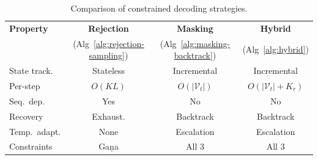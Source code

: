
\begin{table}[H]
\centering
\scriptsize
\caption{Comparison of constrained decoding strategies.}
\label{tab:strategy-comparison}
\begin{tabular}{lccc}
\toprule
\textbf{Property}
    & \textbf{Rejection}
    & \textbf{Masking}
    & \textbf{Hybrid} \\
    & (Alg~\ref{alg:rejection-sampling})
    & (Alg~\ref{alg:masking-backtrack})
    & (Alg~\ref{alg:hybrid}) \\
\midrule
State track.
    & Stateless
    & Incremental
    & Incremental \\
Per-step
    & $O(KL)$
    & $O(|\mathcal{V}_t|)$
    & $O(|\mathcal{V}_t|{+}K_r)$ \\
Seq.\ dep.
    & Yes
    & No
    & No \\
Recovery
    & Exhaust.
    & Backtrack
    & Backtrack \\
Temp.\ adapt.
    & None
    & Escalation
    & Escalation \\
Constraints
    & Ga\d{n}a
    & All 3
    & All 3 \\
\bottomrule
\end{tabular}
\end{table}
